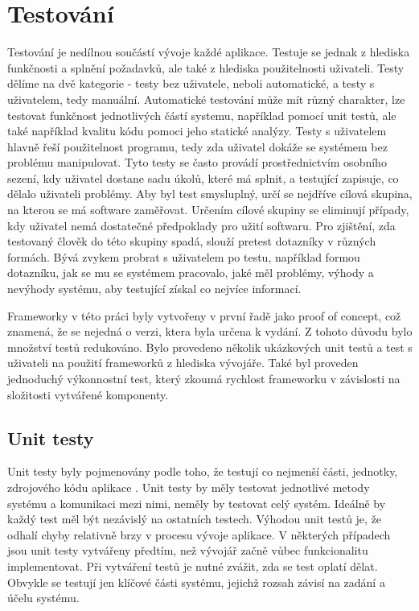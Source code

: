 \chapter{Testování} 		
Testování je nedílnou součástí vývoje každé aplikace. Testuje se jednak z hlediska funkčnosti a splnění požadavků, ale také z hlediska použitelnosti uživateli. Testy dělíme na dvě kategorie - testy bez uživatele, neboli automatické, a testy s uživatelem, tedy manuální.  Automatické testování může mít různý charakter, lze testovat funkčnost jednotlivých částí systemu, například pomocí unit testů, ale také například kvalitu kódu pomoci jeho statické analýzy. Testy s uživatelem hlavně řeší použitelnost programu, tedy zda uživatel dokáže se systémem bez problému manipulovat. Tyto testy se často provádí prostřednictvím osobního sezení, kdy uživatel dostane sadu úkolů, které má splnit, a testující zapisuje, co dělalo uživateli problémy. Aby byl test smysluplný, určí se nejdříve cílová skupina, na kterou se má software zaměřovat. Určením cílové skupiny se eliminují případy, kdy uživatel nemá dostatečné předpoklady pro užití softwaru. Pro zjištění, zda testovaný člověk do této skupiny spadá, slouží pretest dotazníky v různých formách. Bývá zvykem probrat s uživatelem po testu, například formou dotazníku, jak se mu se systémem pracovalo, jaké měl problémy, výhody a nevýhody systému, aby testující získal co nejvíce informací.  

Frameworky v této práci byly vytvořeny v první řadě jako proof of concept, což znamená, že se nejedná o verzi, ktera byla určena k vydání. Z tohoto důvodu bylo množství testů redukováno. Bylo provedeno několik ukázkových unit testů a test s uživateli na použití frameworků z hlediska vývojáře. Také byl proveden jednoduchý výkonnostní test, který zkoumá rychlost frameworku v závislosti na složitosti vytvářené komponenty.

\section{Unit testy} 
Unit testy byly pojmenovány podle toho, že testují co nejmenší části, jednotky, zdrojového kódu aplikace \cite{unit-fowler}. Unit testy by měly testovat jednotlivé metody systému a komunikaci mezi nimi, neměly by testovat celý systém. Ideálně by každý test měl být nezávislý na ostatních testech. Výhodou unit testů je, že odhalí chyby relativně brzy v procesu vývoje aplikace. V některých případech jsou unit testy vytvářeny předtím, než vývojář začně vůbec funkcionalitu implementovat. Při vytváření testů je nutné zvážit, zda se test oplatí dělat. Obvykle se testují jen klíčové části systému, jejichž rozsah závisí na zadání a účelu systému.  

